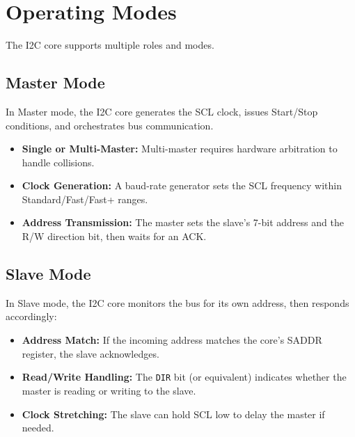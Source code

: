 \section{Operating Modes}

The I2C core supports multiple roles and modes.

\subsection{Master Mode}
In Master mode, the I2C core generates the SCL clock, issues Start/Stop conditions, and orchestrates bus communication.

\begin{itemize}
    \item \textbf{Single or Multi-Master:} Multi-master requires hardware arbitration to handle collisions.
    \item \textbf{Clock Generation:} A baud-rate generator sets the SCL frequency within Standard/Fast/Fast+ ranges.
    \item \textbf{Address Transmission:} The master sets the slave’s 7-bit address and the R/W direction bit, then waits for an ACK.
\end{itemize}

\subsection{Slave Mode}
In Slave mode, the I2C core monitors the bus for its own address, then responds accordingly:

\begin{itemize}
    \item \textbf{Address Match:} If the incoming address matches the core's SADDR register, the slave acknowledges.
    \item \textbf{Read/Write Handling:} The \texttt{DIR} bit (or equivalent) indicates whether the master is reading or writing to the slave.
    \item \textbf{Clock Stretching:} The slave can hold SCL low to delay the master if needed.
\end{itemize}

